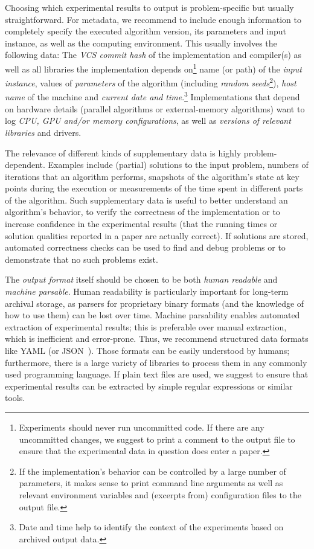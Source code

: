 \documentclass[algorithms,article,submit,moreauthors,pdftex]{Definitions/mdpi}
\begin{document}
	Choosing which experimental results to output is problem-specific but
	usually straightforward. For metadata, we recommend to include
	enough information to completely specify the executed algorithm version, its parameters and input instance, as well as the computing
	environment. This usually involves the following data:
	The \emph{VCS commit hash} of the implementation and compiler(s) as well as all
	libraries the implementation depends on\footnote{Experiments should never run
		uncommitted code. If there are any uncommitted changes,
		we suggest to print a comment to the output file to ensure that the
		experimental data in question
		does enter a paper.}
	name (or path) of the \emph{input instance},
	values of \emph{parameters}
	of the algorithm (including \emph{random seeds}\footnote{If the implementation's behavior
		can be controlled by a large number
		of parameters, it makes sense to print
		command line arguments
		as well as relevant environment variables and (excerpts from) configuration files
		to the output file.}),
	\emph{host name} of the machine and
	\emph{current date and time}.\footnote{Date and time help to identify
	the context of the experiments based on archived output data.}
	Implementations that depend on hardware details
	(\eg parallel algorithms or external-memory algorithms)
	want to log \emph{CPU, GPU and/or memory configurations},
	as well as \emph{versions of relevant libraries} and drivers.

	The relevance of different kinds of supplementary data is highly
	problem-dependent. Examples include (partial) solutions to the input problem,
	numbers of iterations that an algorithm performs, snapshots of
	the algorithm's state at key points during the execution
	or measurements of the time spent in different parts of the algorithm.
	Such supplementary data is useful
	to better understand an algorithm's behavior, to verify the correctness
	of the implementation or to increase confidence in the experimental
	results (\ie that the running times or solution qualities reported
	in a paper are actually correct).
	If solutions are stored, automated correctness checks can be used
	to find and debug problems or to demonstrate that no such problems exist.

	The \emph{output format} itself should be chosen to be both
	\emph{human readable} and \emph{machine parsable}.
	Human readability is particularly important for long-term archival
	storage, as parsers for proprietary binary formats (and the knowledge of how to use them)
	can be lost over time.
	Machine parsability enables automated extraction of experimental results;
	this is preferable over manual extraction, which is inefficient and error-prone.
	Thus, we recommend structured data formats like YAML (or JSON~\cite{json}).
	Those formats can be easily understood by humans; furthermore,
	there is a large variety of libraries to process them in any
	commonly used programming language.
	If plain text files are used, we suggest to ensure that
	experimental results can be extracted by simple regular expressions or similar tools.
\end{document}
